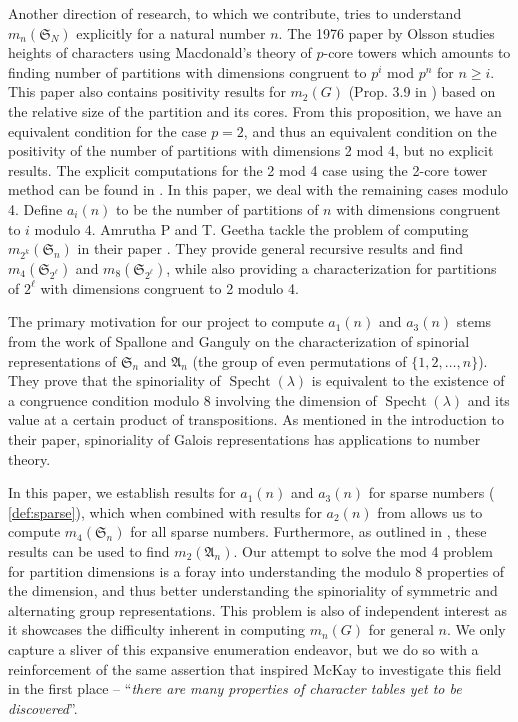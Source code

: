 \documentclass[12pt]{amsart}
\theoremstyle{definition}
\numberwithin{equation}{section}
\newcommand{\la}{\lambda}
\renewcommand{\SS}{\mathfrak{S}}
\DeclareMathOperator{\specht}{Specht}
\begin{document}
Another direction of research, to which we contribute, tries to understand $m_n(\SS_N)$ explicitly for a natural number $n$. The 1976 paper \cite{olsson-paper} by Olsson studies heights of characters using Macdonald's theory of $p$-core towers which amounts to finding number of partitions with dimensions congruent to $p^i$ mod $p^n$ for $n\geq i$. This paper also contains positivity results for $m_2(G)$ (Prop. 3.9 in \cite{olsson-paper}) based on the relative size of the partition and its cores. From this proposition, we have an equivalent condition for the case $p = 2$, and thus an equivalent condition on the positivity of the number of partitions with dimensions 2 mod 4, but no explicit results. The explicit computations for the 2 mod 4 case using the 2-core tower method can be found in \cite{khanna-2mod4}. In this paper, we deal with the remaining cases modulo 4. 
Define $a_{i}(n)$  to be the number of partitions of $n$ with dimensions congruent to $i$ modulo $4$. Amrutha P and T. Geetha tackle the problem of computing $m_{2^k}(\SS_n)$ in their paper \cite{geetha}. They provide general recursive results and find $m_4(\SS_{2^\ell})$ and $m_8(\SS_{2^\ell})$, while also providing a characterization for partitions of $2^\ell$ with dimensions congruent to 2 modulo 4. 

The primary motivation for our project to compute $a_1(n)$ and $a_3(n)$ stems from the work \cite{jyo} of Spallone and Ganguly on the characterization of spinorial representations of $\SS_n$ and $\mathfrak{A}_n$ (the group of even permutations of $\{1,2,\ldots, n\}$). They prove that the spinoriality of $\specht(\la)$ is equivalent to the existence of a congruence condition modulo 8 involving the dimension of $\specht(
\la)$ and its value at a certain product of transpositions. As mentioned in the introduction to their paper, spinoriality of Galois representations has applications to number theory.

In this paper, we establish results for $a_1(n)$ and $a_3(n)$ for sparse numbers (  \cref{def:sparse}), which when combined with results for $a_2(n)$ from \cite{khanna-2mod4} allows us to compute $m_4(
\SS_n)$ for all sparse numbers. Furthermore, as outlined in \cite{khanna}, these results can be used to find $m_2(\mathfrak{A}_n)$. Our attempt to solve the mod 4 problem for partition dimensions is a foray into understanding the modulo 8 properties of the dimension, and thus better understanding the spinoriality of symmetric and alternating group representations. This problem is also of independent interest as it showcases the difficulty inherent in computing $m_n(G)$ for general $n$. We only capture a sliver of this expansive enumeration endeavor, but we do so with a reinforcement of the same assertion that inspired McKay to investigate this field in the first place --  ``\textit{there are many properties of character tables yet to be discovered}''.
\end{document}
